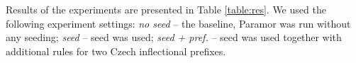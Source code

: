 \documentclass[11pt]{article}
\newcommand{\e}[1]{\textit{#1}} %
\begin{document}
\noindent
Results of the experiments are presented in Table \ref{table:res}. We used the following experiment settings: \e{no seed} -- the baseline, Paramor was run without any seeding; \e{seed} -- seed was used; \e{seed + pref.} -- seed was used together with additional rules for two Czech inflectional prefixes.

\end{document}

